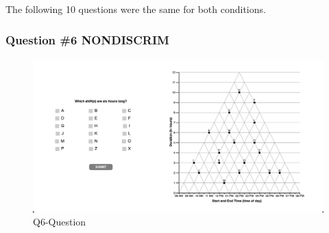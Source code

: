 \documentclass[
  letterpaper,
  DIV=11,
  numbers=noendperiod]{scrreprt}
\begin{document}
The following 10 questions were the same for both conditions.

\hypertarget{question-6-nondiscrim}{%
\subsubsection{Question \#6 NONDISCRIM}\label{question-6-nondiscrim}}

\begin{figure}

{\centering \includegraphics{analysis/SGC3A/static/questions/Q6.png}

}

\caption{\label{fig-Q6}Q6-Question}

\end{figure}
\end{document}
